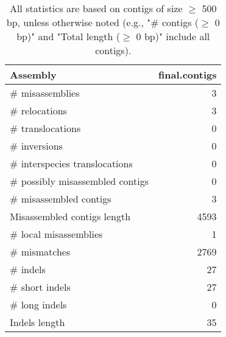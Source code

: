 \documentclass[12pt,a4paper]{article}
\begin{document}
\begin{table}[ht]
\begin{center}
\caption{All statistics are based on contigs of size $\geq$ 500 bp, unless otherwise noted (e.g., "\# contigs ($\geq$ 0 bp)" and "Total length ($\geq$ 0 bp)" include all contigs).}
\begin{tabular}{|l*{1}{|r}|}
\hline
Assembly & final.contigs \\ \hline
\# misassemblies & 3 \\ \hline
\hspace{5mm}\# relocations & 3 \\ \hline
\hspace{5mm}\# translocations & 0 \\ \hline
\hspace{5mm}\# inversions & 0 \\ \hline
\hspace{5mm}\# interspecies translocations & 0 \\ \hline
\# possibly misassembled contigs & 0 \\ \hline
\# misassembled contigs & 3 \\ \hline
Misassembled contigs length & 4593 \\ \hline
\# local misassemblies & 1 \\ \hline
\# mismatches & 2769 \\ \hline
\# indels & 27 \\ \hline
\hspace{5mm}\# short indels & 27 \\ \hline
\hspace{5mm}\# long indels & 0 \\ \hline
Indels length & 35 \\ \hline
\end{tabular}
\end{center}
\end{table}
\end{document}
